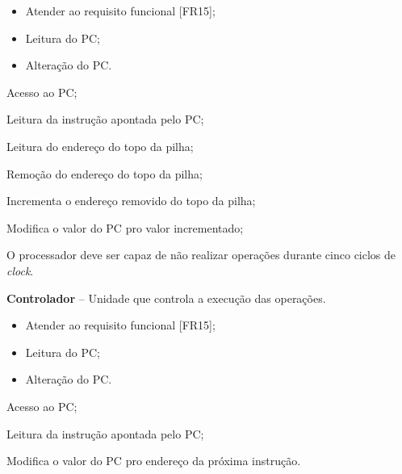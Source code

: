 \documentclass{article}
\begin{document}
  \preconditions 
  \begin{itemize}
  	\item Atender ao requisito funcional [FR15];
  	\item Leitura do PC;
  \end{itemize}
  
  \postconditions
  \begin{itemize}
  	\item Alteração do PC.
  \end{itemize}
  
  
  \begin{mainflow}
  	\item Acesso ao PC;
  	\item Leitura da instrução apontada pelo PC;
  	\item Leitura do endereço do topo da pilha;
  	\item Remoção do endereço do topo da pilha;
  	\item Incrementa o endereço removido do topo da pilha;
  	\item Modifica o valor do PC pro valor incrementado;
  \end{mainflow}
  
  O processador deve ser capaz de não realizar operações durante cinco ciclos de \textit{clock}.
  \actors
  \begin{description}
  	\item \textbf{Controlador} – Unidade que controla a execução das operações.
  \end{description}
  
  \preconditions 
  \begin{itemize}
  	\item Atender ao requisito funcional [FR15];
  	\item Leitura do PC;
  \end{itemize}
  
  \postconditions
  \begin{itemize}
  	\item Alteração do PC.
  \end{itemize}
  
  
  \begin{mainflow}
  	\item Acesso ao PC;
  	\item Leitura da instrução apontada pelo PC;
  	\item Modifica o valor do PC pro endereço da próxima instrução.
  \end{mainflow} 

% 
% 
\end{document}
